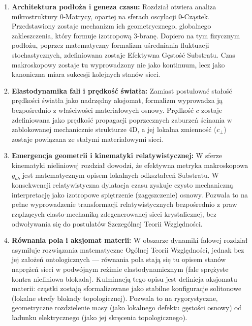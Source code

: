 \documentclass[
  polish,
  letterpaper,
  DIV=11,
  numbers=noendperiod,
  oneside]{scrartcl}
\providecommand{\tightlist}{%
  \setlength{\itemsep}{0pt}\setlength{\parskip}{0pt}}
\begin{document}
\begin{enumerate}
\def\labelenumi{\arabic{enumi}.}
\tightlist
\item
  \textbf{Architektura podłoża i geneza czasu:} Rozdział otwiera analiza
  mikrostruktury 0-Matrycy, opartej na sferach oscylacji 0-Cząstek.
  Przedstawiony zostaje mechanizm ich geometrycznego, globalnego
  zakleszczenia, który formuje izotropową 3‑branę. Dopiero na tym
  fizycznym podłożu, poprzez matematyczny formalizm uśredniania
  fluktuacji stochastycznych, zdefiniowana zostaje Efektywna Gęstość
  Substratu. Czas makroskopowy zostaje tu wyprowadzony nie jako
  kontinuum, lecz jako kanoniczna miara sukcesji kolejnych stanów sieci.
\item
  \textbf{Elastodynamika fali i prędkość światła:} Zamiast postulować
  stałość prędkości światła jako nadrzędny aksjomat, formalizm
  wyprowadza ją bezpośrednio z właściwości materiałowych osnowy.
  Prędkość \(c\) zostaje zdefiniowana jako prędkość propagacji
  poprzecznych zaburzeń ścinania w zablokowanej mechanicznie strukturze
  4D, a jej lokalna zmienność (\(c_{\perp}\)) zostaje powiązana ze
  stałymi materiałowymi sieci.
\item
  \textbf{Emergencja geometrii i kinematyki relatywistycznej:} W sferze
  kinematyki nieliniowej rozdział dowodzi, że efektywna metryka
  makroskopowa \(g_{ab}\) jest matematycznym opisem lokalnych
  odkształceń Substratu. W konsekwencji relatywistyczna dylatacja czasu
  zyskuje czysto mechaniczną interpretację jako izotropowe spiętrzenie
  (zagęszczenie) osnowy. Pozwala to na pełne wyprowadzenie transformacji
  relatywistycznych bezpośrednio z praw rządzących elasto-mechaniką
  zdegenerowanej sieci krystalicznej, bez odwoływania się do postulatów
  Szczególnej Teorii Względności.
\item
  \textbf{Równania pola i aksjomat materii:} W obszarze dynamiki falowej
  rozdział asymiluje rozwiązania matematyczne Ogólnej Teorii
  Względności, jednak bez jej założeń ontologicznych --- równania pola
  stają się tu opisem stanów naprężeń sieci w podwójnym reżimie
  elastodynamicznym (fale sprężyste kontra nieliniowa blokada).
  Kulminacją tego opisu jest definicja aksjomatu materii: cząstki
  zostają sformalizowane jako stabilne konfiguracje solitonowe (lokalne
  strefy blokady topologicznej). Pozwala to na rygorystyczne,
  geometryczne rozdzielenie masy (jako lokalnego defektu gęstości
  osnowy) od ładunku elektrycznego (jako jej skręcenia topologicznego).
\end{enumerate}
\end{document}
